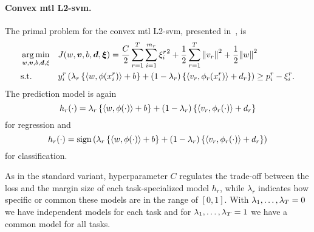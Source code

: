 \paragraph*{{Convex} \acrshort{mtl} L2-\acrshort{svm}.\\}
The primal problem for the convex \acrshort{mtl} L2-\acrshort{svm}, presented in~\cite{RuizAD21}, is
\begin{equation}\label{eq:svmmtl_primal_convex_l2}
    \begin{aligned}
    & \argmin_{w, \fv{v}, b, \fv{d}, \xi}
    & & {J({w}, \fv{v}, b, \fv{d}, \fv{\xi}) = \frac{C}{2} \sum_{r= 1}^T \sum_{i=1}^{m_r} {\xi_{i}^r}^2 + \frac{1}{2} \sum_{r= 1}^T{\norm{{v}_r}^2} + \frac{1}{2} {\norm{{w}}}^2} \\
    & \text{s.t.}
    & & y_{i}^r \left(\lambda_r \left\lbrace \dotp{w}{\phi(x_{i}^r)} + b  \right\rbrace + (1 - \lambda_r) \left\lbrace \dotp{{v}_r}{\phi_r(x_{i}^r)} + d_r \right\rbrace  \right) \geq p_{i}^r - \xi_{i}^r .  \\
    \end{aligned}
\end{equation}
The prediction model is again
\begin{equation}
    \nonumber
    h_r(\cdot) = \lambda_r \left\lbrace \left\langle w, \phi(\cdot) \right\rangle + b  \right\rbrace + (1 - \lambda_r) \left\lbrace \left\langle {v}_r, \phi_r(\cdot) \right\rangle + d_r \right\rbrace
\end{equation}
for regression and 
\begin{equation}
    \nonumber
    h_r(\cdot) = \operatorname{sign}{ \left(\lambda_r \left\lbrace \left\langle w, \phi(\cdot) \right\rangle + b  \right\rbrace + (1 - \lambda_r) \left\lbrace \left\langle {v}_r, \phi_r(\cdot) \right\rangle + d_r \right\rbrace \right)}
\end{equation}
for classification.
%

As in the standard variant, hyperparameter $C$ regulates the trade-off between the loss and the margin size of each task-specialized model $h_r$, while $\lambda_r$ indicates how specific or common these models are in the range of $[0, 1]$. With $\lambda_1, \ldots, \lambda_T=0$ we have independent models for each task and for $\lambda_1, \ldots, \lambda_T=1$ we have a common model for all tasks. 
 


